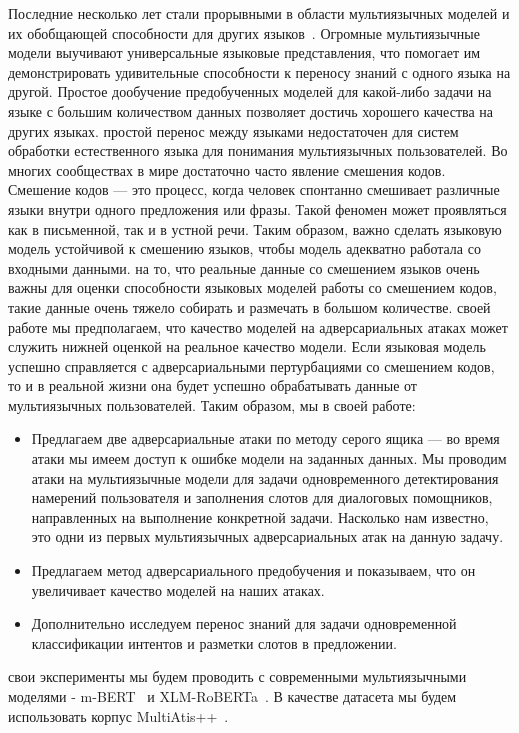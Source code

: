 Последние несколько лет стали прорывными в области мультиязычных моделей и их обобщающей способности для других языков~\cite{Liu2020WhatMM,Wu2019BetoBB}.
Огромные мультиязычные модели выучивают универсальные языковые представления, что помогает им демонстрировать удивительные способности к переносу знаний с одного языка на другой.
Простое дообучение предобученных моделей для какой-либо задачи на языке с большим количеством данных позволяет достичь хорошего качества на других языках.
 простой перенос между языками недостаточен для систем обработки естественного языка для понимания мультиязычных пользователей.
Во многих сообществах в мире достаточно часто явление смешения кодов.
Смешение кодов — это процесс, когда человек спонтанно смешивает различные языки внутри одного предложения или фразы.
Такой феномен может проявляться как в письменной, так и в устной речи.
Таким образом, важно сделать языковую модель устойчивой к смешению языков, чтобы модель адекватно работала со входными данными.
 на то, что реальные данные со смешением языков очень важны для оценки способности языковых моделей работы со смешением кодов, такие данные очень тяжело собирать и размечать в большом количестве.
 своей работе мы предполагаем, что качество моделей на адверсариальных атаках может служить нижней оценкой на реальное качество модели.
Если языковая модель успешно справляется с адверсариальными пертурбациями со смешением кодов, то и в реальной жизни она будет успешно обрабатывать данные от мультиязычных пользователей.
Таким образом, мы в своей работе:
\begin{itemize}
    \item Предлагаем две адверсариальные атаки по методу серого ящика — во время атаки мы имеем доступ к ошибке модели на заданных данных.
    Мы проводим атаки на мультиязычные модели для задачи одновременного детектирования намерений пользователя и заполнения слотов для диалоговых помощников, направленных на выполнение конкретной задачи.
    Насколько нам известно, это одни из первых мультиязычных адверсариальных атак на данную задачу.
    \item Предлагаем метод адверсариального предобучения и показываем, что он увеличивает качество моделей на наших атаках.
    \item Дополнительно исследуем перенос знаний для задачи одновременной классификации интентов и разметки слотов в предложении.
\end{itemize}
 свои эксперименты мы будем проводить с современными мультиязычными моделями - m-BERT~\cite{devlin-etal-2019-bert} и XLM-RoBERTa~\cite{Conneau2020UnsupervisedCR}.
В качестве датасета мы будем использовать корпус MultiAtis++~\cite{Xu2020EndtoEndSA}.
